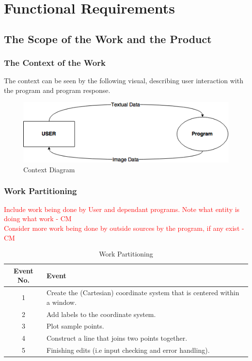 \documentclass[12pt, titlepage]{article}
\begin{document}
\section{Functional Requirements}

\subsection{The Scope of the Work and the Product}

\subsubsection{The Context of the Work}
The context can be seen by the following visual, describing user interaction with the program and program response. \\
		
	\begin{figure}[!htb]
		\includegraphics[scale=0.8]{img/ContextDiagram.png}
		\caption{Context Diagram}
	\end{figure}
	
\subsubsection{Work Partitioning}
\textcolor{red}{Include work being done by User and dependant programs. Note what entity is doing what work - CM} \\
\textcolor{red}{Consider more work being done by outside sources by the program, if any exist - CM} \\
\begin{center}
\begin{table}[!hpb]
    \caption{Work Partitioning} 
    \begin{tabular}{ |c|p{11cm}|}
	\hline
	Event No. & Event\\ \hline
	1 & Create the (Cartesian) coordinate system that is centered within a window.\\ \hline
	2 & Add labels to the coordinate system. \\ \hline
	3 & Plot sample points.\\ \hline
	4 & Construct a line that joins two points together.\\ \hline
	5 & Finishing edits (i.e input checking and error handling).\\ \hline
    \end{tabular}

\end{table}
\end{center}
\end{document}
